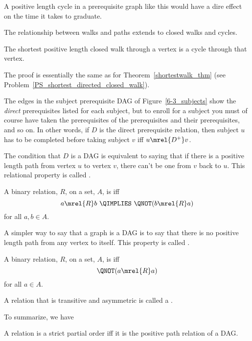A positive length cycle in a prerequisite graph like this would have a
dire effect on the time it takes to graduate.

The relationship between walks and paths extends to closed walks and cycles.
\begin{lemma}\label{shortestclosedwalk_lem}
The shortest positive length closed walk through a vertex is a cycle
through that vertex.
\end{lemma}
The proof is essentially the same as for
Theorem~\ref{shortestwalk_thm} (see
Problem~\ref{PS_shortest_directed_closed_walk}).

The edges in the subject prerequisite DAG of Figure~\ref{6-3_subjects}
show the \emph{direct} prerequisites listed for each subject, but to
enroll for a subject you must of course have taken the prerequisites
of the prerequisites and their prerequisites, and so on.  In other
words, if $D$ is the direct prerequisite relation, then subject $u$
has to be completed before taking subject $v$ iff $u \mrel{D^+} v$.

The condition that $D$ is a DAG is equivalent to saying that if there
is a positive length path from vertex $u$ to vertex $v$, there can't
be one from $v$ back to $u$.  This relational property is called
.

\begin{definition}
A binary relation, $R$, on a set, $A$, is
 iff
\[
a \mrel{R} b\ \QIMPLIES\ \QNOT(b \mrel{R} a)
\]
for all $a,b\in A$.
\end{definition}

A simpler way to say that a graph is a DAG is to say that there is no
positive length path from any vertex to itself.  This property is
called .

\begin{definition}
A binary relation, $R$, on a set, $A$, is
 iff
\[
\QNOT(a \mrel{R} a)
\]
for all $a \in A$.
\end{definition}

\begin{definition}
A relation that is transitive and asymmetric is called a .
\end{definition}

To summarize, we have
\begin{theorem}
A relation is a strict partial order iff it is the positive path relation of a DAG.
\end{theorem}

